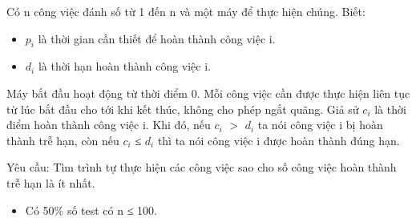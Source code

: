 Có n công việc đánh số từ 1 đến n và một máy để thực hiện chúng. Biết:  
\begin{itemize}
	\item     $p_{i}$    là thời gian cần thiết để hoàn thành công việc i.   
	\item     $d_{i}$    là thời hạn hoàn thành công việc i.   
\end{itemize}

   Máy bắt đầu hoạt động từ thời điểm 0. Mỗi công việc cần được thực hiện liên tục từ lúc bắt đầu cho tới khi kết thúc, không cho phép ngắt quãng. Giả sử $c_{i}$   là thời điểm hoàn thành công việc i. Khi đó, nếu $c_{i}$   $>$  $d_{i}$   ta nói công việc i bị hoàn thành trễ hạn, còn nếu  $c_{i}$   ≤ $d_{i}$   thì ta nói công việc i được hoàn thành đúng hạn.  

   Yêu cầu: Tìm trình tự thực hiện các công việc sao cho số công việc hoàn thành trễ hạn là ít nhất.
\begin{itemize}
	\item     Có 50\% số test có n ≤ 100.   
\end{itemize}